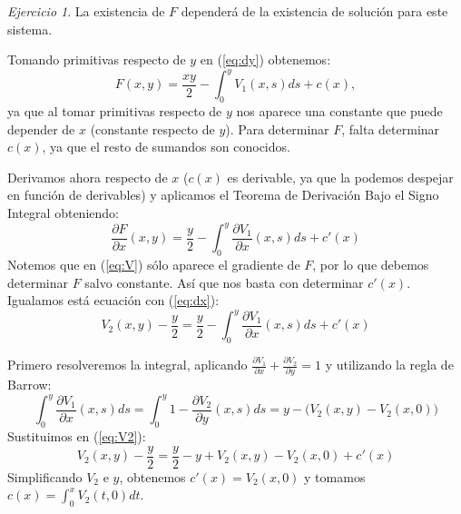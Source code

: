 \documentclass[12pt,spanish]{article}
\theoremstyle{definition}
\theoremstyle{remark}
\newtheorem{exercise}{Ejercicio}
\begin{document}
\begin{exercise}
La existencia de $F$ dependerá de la existencia de solución para este
sistema.

Tomando primitivas respecto de $y$ en (\ref{eq:dy}) obtenemos:
\begin{equation} \label{eq:Fc}
  F(x,y)=\frac{xy}{2}-\int_0^y V_1(x,s)ds+c(x),
\end{equation}
ya que al tomar primitivas respecto de $y$ nos aparece una constante
que puede depender de $x$ (constante respecto de $y$). Para determinar
$F$, falta determinar $c(x)$, ya que el resto de sumandos son
conocidos.

Derivamos ahora respecto de $x$ ($c(x)$ es derivable, ya que la
podemos despejar en función de derivables) y aplicamos el Teorema de
Derivación Bajo el Signo Integral obteniendo:
\[\frac{\partial F}{\partial x}(x,y)=\frac{y}{2}-\int_0^y
  \frac{\partial V_1}{\partial x}(x,s)ds+c'(x)\] Notemos que en
(\ref{eq:V}) sólo aparece el gradiente de $F$, por lo que debemos
determinar $F$ salvo constante. Así que nos basta con determinar
$c'(x)$. Igualamos está ecuación con (\ref{eq:dx}):
\begin{equation} \label{eq:V2}
  V_2(x,y)-\frac{y}{2}=\frac{y}{2}-\int_0^y
  \frac{\partial V_1}{\partial x}(x,s)ds+c'(x)
\end{equation}

Primero resolveremos la integral, aplicando
$\frac{\partial V_1}{\partial x}+\frac{\partial V_2}{\partial y}=1$ y
utilizando la regla de Barrow:
\begin{equation} \label{eq:int}
  \int_0^y \frac{\partial V_1}{\partial x}(x,s)ds=\int_0^y
  1-\frac{\partial V_2}{\partial y}(x,s)ds=y-\big(V_2(x,y)-V_2(x,0)\big)
\end{equation}
Sustituimos en (\ref{eq:V2}):
\begin{equation} \label{eq:c'}
  V_2(x,y)-\frac{y}{2}=\frac{y}{2}-y+V_2(x,y)-V_2(x,0)+c'(x)
\end{equation}
Simplificando $V_2$ e $y$, obtenemos $c'(x)=V_2(x,0)$ y tomamos
$c(x)=\int_0^x V_2(t,0)dt$.


\end{exercise}
\end{document}
